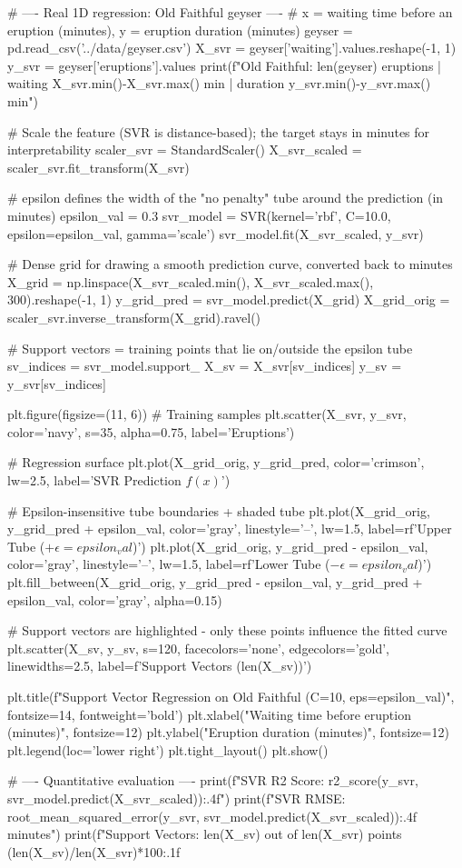 \begin{codebox}[title={Real 1D regression: Old Faithful geyser}]
# ---- Real 1D regression: Old Faithful geyser ----
# x = waiting time before an eruption (minutes), y = eruption duration (minutes)
geyser = pd.read_csv('../data/geyser.csv')
X_svr = geyser['waiting'].values.reshape(-1, 1)
y_svr = geyser['eruptions'].values
print(f"Old Faithful: {len(geyser)} eruptions | waiting {X_svr.min()}-{X_svr.max()} min | duration {y_svr.min()}-{y_svr.max()} min")

# Scale the feature (SVR is distance-based); the target stays in minutes for interpretability
scaler_svr = StandardScaler()
X_svr_scaled = scaler_svr.fit_transform(X_svr)

# epsilon defines the width of the "no penalty" tube around the prediction (in minutes)
epsilon_val = 0.3
svr_model = SVR(kernel='rbf', C=10.0, epsilon=epsilon_val, gamma='scale')
svr_model.fit(X_svr_scaled, y_svr)

# Dense grid for drawing a smooth prediction curve, converted back to minutes
X_grid = np.linspace(X_svr_scaled.min(), X_svr_scaled.max(), 300).reshape(-1, 1)
y_grid_pred = svr_model.predict(X_grid)
X_grid_orig = scaler_svr.inverse_transform(X_grid).ravel()

# Support vectors = training points that lie on/outside the epsilon tube
sv_indices = svr_model.support_
X_sv = X_svr[sv_indices]
y_sv = y_svr[sv_indices]

plt.figure(figsize=(11, 6))
# Training samples
plt.scatter(X_svr, y_svr, color='navy', s=35, alpha=0.75, label='Eruptions')

# Regression surface
plt.plot(X_grid_orig, y_grid_pred, color='crimson', lw=2.5, label='SVR Prediction $f(x)$')

# Epsilon-insensitive tube boundaries + shaded tube
plt.plot(X_grid_orig, y_grid_pred + epsilon_val, color='gray', linestyle='--', lw=1.5, label=rf'Upper Tube ($+\epsilon={epsilon_val}$)')
plt.plot(X_grid_orig, y_grid_pred - epsilon_val, color='gray', linestyle='--', lw=1.5, label=rf'Lower Tube ($-\epsilon={epsilon_val}$)')
plt.fill_between(X_grid_orig, y_grid_pred - epsilon_val, y_grid_pred + epsilon_val, color='gray', alpha=0.15)

# Support vectors are highlighted - only these points influence the fitted curve
plt.scatter(X_sv, y_sv, s=120, facecolors='none', edgecolors='gold', linewidths=2.5, label=f'Support Vectors ({len(X_sv)})')

plt.title(f"Support Vector Regression on Old Faithful (C=10, eps={epsilon_val})", fontsize=14, fontweight='bold')
plt.xlabel("Waiting time before eruption (minutes)", fontsize=12)
plt.ylabel("Eruption duration (minutes)", fontsize=12)
plt.legend(loc='lower right')
plt.tight_layout()
plt.show()

# ---- Quantitative evaluation ----
print(f"SVR R2 Score: {r2_score(y_svr, svr_model.predict(X_svr_scaled)):.4f}")
print(f"SVR RMSE:     {root_mean_squared_error(y_svr, svr_model.predict(X_svr_scaled)):.4f} minutes")
print(f"Support Vectors: {len(X_sv)} out of {len(X_svr)} points ({len(X_sv)/len(X_svr)*100:.1f}%
\end{codebox}

